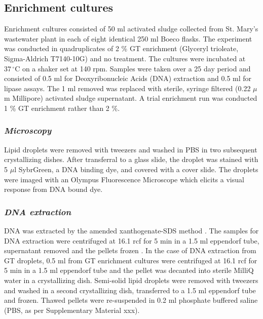 \documentclass[11pt]{article}
\begin{document}
\subsection{Enrichment cultures}
Enrichment cultures consisted of 50 ml activated sludge collected from St. Mary's wastewater plant in each of eight identical 250 ml Boeco flasks. The experiment was conducted in quadruplicates of 2 \% GT enrichment (Glyceryl trioleate, Sigma-Aldrich T7140-10G) and no treatment. The cultures were incubated at $37\,^{\circ}\mathrm{C}$ on a shaker set at 140 rpm. Samples were taken over a 25 day period and consisted of 0.5 ml for Deoxyribonucleic Acids (DNA) extraction and 0.5 ml for lipase assays. The 1 ml removed was replaced with sterile, syringe filtered (0.22 $\mu$m Millipore) activated sludge supernatant. 
A trial enrichment run was conducted 1 \% GT enrichment rather than 2 \%.

\subsubsection{\emph{Microscopy}}
Lipid droplets were removed with tweezers and washed in PBS in two subsequent crystallizing dishes. After transferral to a glass slide, the droplet was stained with 5 $\mu$l SybrGreen, a DNA binding dye, and covered with a cover slide. The droplets were imaged with an Olympus Fluorescence Microscope which elicits a visual response from DNA bound dye.

\subsubsection{\emph{DNA extraction}}
DNA was extracted by the amended xanthogenate-SDS method \cite{tillett2000xanthogenate}. The samples for DNA extraction were centrifuged at 16.1 rcf for 5 min in a 1.5 ml eppendorf tube, supernatant removed and the pellets frozen . In the case of DNA extraction from GT droplets, 0.5 ml from GT enrichment cultures were centrifuged at 16.1 rcf for 5 min in a 1.5 ml eppendorf tube and the pellet was decanted into sterile MilliQ water in a crystallizing dish. Semi-solid lipid droplets were removed with tweezers and washed in a second crystallizing dish, transferred to a 1.5 ml eppendorf tube and frozen. Thawed pellets were re-suspended in 0.2 ml phosphate buffered saline (PBS, as per Supplementary Material xxx).
\end{document}
